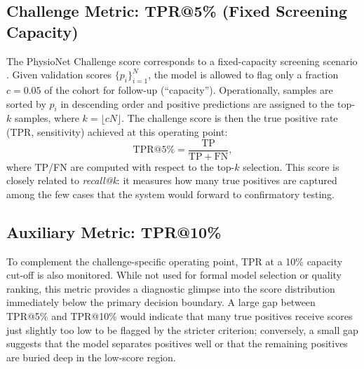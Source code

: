
\subsection{Challenge Metric: TPR@5\% (Fixed Screening Capacity)}
The PhysioNet Challenge score corresponds to a fixed-capacity screening scenario \parencite{2025ChallengePreprint,2025ChallengeCinC}.
Given validation scores $\{p_i\}_{i=1}^{N}$, the model is allowed to flag only a fraction $c=0.05$ of the cohort for follow-up (``capacity'').
Operationally, samples are sorted by $p_i$ in descending order and positive predictions are assigned to the top-$k$ samples, where $k=\lfloor cN \rfloor$.
The challenge score is then the true positive rate (TPR, sensitivity) achieved at this operating point:
\begin{equation}
  \mathrm{TPR@5\%} = \frac{\mathrm{TP}}{\mathrm{TP}+\mathrm{FN}},
  \label{eq:tpr-at-5}
\end{equation}
where TP/FN are computed with respect to the top-$k$ selection.
This score is closely related to \emph{recall@k}: it measures how many true positives are captured among the few cases that the system would forward to confirmatory testing.
\subsection{Auxiliary Metric: TPR@10\%}
To complement the challenge-specific operating point, TPR at a 10\% capacity cut-off is also monitored.
While not used for formal model selection or quality ranking, this metric provides a diagnostic glimpse into the score distribution immediately below the primary decision boundary.
A large gap between TPR@5\% and TPR@10\% would indicate that many true positives receive scores just slightly too low to be flagged by the stricter criterion; conversely, a small gap suggests that the model separates positives well or that the remaining positives are buried deep in the low-score region.

